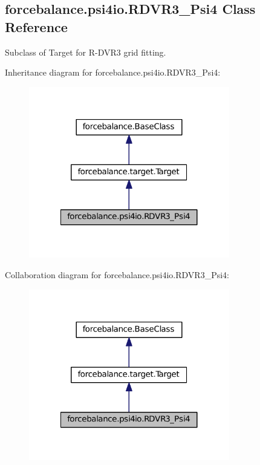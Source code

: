 \hypertarget{classforcebalance_1_1psi4io_1_1RDVR3__Psi4}{\subsection{forcebalance.\-psi4io.\-R\-D\-V\-R3\-\_\-\-Psi4 \-Class \-Reference}
\label{classforcebalance_1_1psi4io_1_1RDVR3__Psi4}
}


\-Subclass of \-Target for \-R-\/\-D\-V\-R3 grid fitting.  




\-Inheritance diagram for forcebalance.\-psi4io.\-R\-D\-V\-R3\-\_\-\-Psi4\-:\nopagebreak
\begin{figure}[H]
\begin{center}
\leavevmode
\includegraphics[width=248pt]{classforcebalance_1_1psi4io_1_1RDVR3__Psi4__inherit__graph}
\end{center}
\end{figure}


\-Collaboration diagram for forcebalance.\-psi4io.\-R\-D\-V\-R3\-\_\-\-Psi4\-:\nopagebreak
\begin{figure}[H]
\begin{center}
\leavevmode
\includegraphics[width=248pt]{classforcebalance_1_1psi4io_1_1RDVR3__Psi4__coll__graph}
\end{center}
\end{figure}
